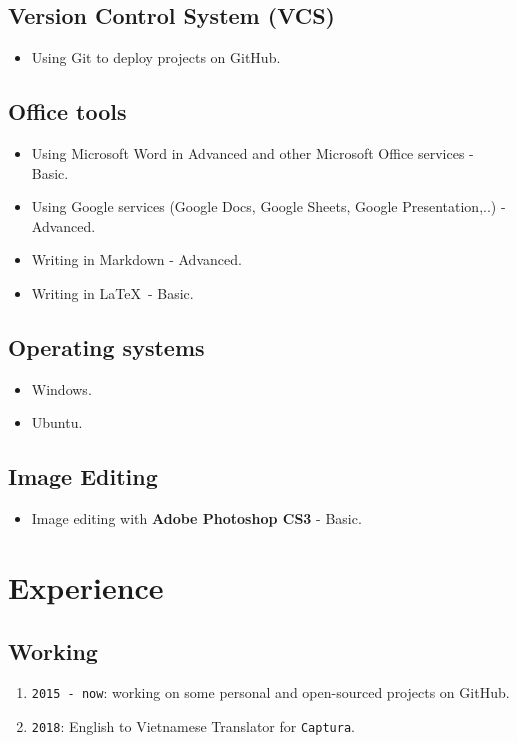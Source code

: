 \documentclass{article}
\begin{document}
        \subsection{Version Control System (VCS)}
        \begin{itemize}
            \item Using Git to deploy projects on GitHub.
        \end{itemize}

        \subsection{Office tools}
        \begin{itemize}
            \item Using Microsoft Word in Advanced and other Microsoft Office services - Basic.
            \item Using Google services (Google Docs, Google Sheets, Google Presentation,..) - Advanced.
            \item Writing in Markdown - Advanced.
            \item Writing in \LaTeX\ - Basic.
        \end{itemize}

        \subsection{Operating systems}
        \begin{itemize}
            \item Windows.
            \item Ubuntu.
        \end{itemize}

        \subsection{Image Editing}
        \begin{itemize}
            \item Image editing with \textbf{Adobe Photoshop CS3} - Basic.
        \end{itemize}

    \section{Experience}
        \subsection{Working}
            \begin{enumerate}
                \item \texttt{2015 - now}: working on some personal and open-sourced projects on GitHub.
                \item \texttt{2018}: English to Vietnamese Translator for \texttt{Captura}\cite{Captura}.
            \end{enumerate}
\end{document}
